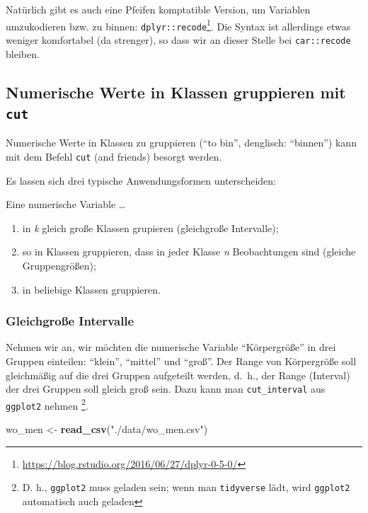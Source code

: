 \documentclass[12pt,ngerman,paper=a4,pagesize,DIV=13]{scrreprt}
\newenvironment{Shaded}{\begin{snugshade}}{\end{snugshade}}
\newcommand{\KeywordTok}[1]{\textcolor[rgb]{0.13,0.29,0.53}{\textbf{#1}}}
\newcommand{\NormalTok}[1]{#1}
\newcommand{\StringTok}[1]{\textcolor[rgb]{0.31,0.60,0.02}{#1}}
\providecommand{\tightlist}{%
  \setlength{\itemsep}{0pt}\setlength{\parskip}{0pt}}
\begin{document}
Natürlich gibt es auch eine Pfeifen komptatible Version, um Variablen
umzukodieren bzw. zu binnen: \texttt{dplyr::recode}\footnote{\url{https://blog.rstudio.org/2016/06/27/dplyr-0-5-0/}}.
Die Syntax ist allerdings etwas weniger komfortabel (da strenger), so
dass wir an dieser Stelle bei \texttt{car::recode} bleiben.

\hypertarget{numerische-werte-in-klassen-gruppieren-mit-cut}{%
\subsection{\texorpdfstring{Numerische Werte in Klassen gruppieren mit
\texttt{cut}}{Numerische Werte in Klassen gruppieren mit cut}}\label{numerische-werte-in-klassen-gruppieren-mit-cut}}

Numerische Werte in Klassen zu gruppieren (\enquote{to bin}, denglisch:
\enquote{binnen}) kann mit dem Befehl \texttt{cut} (and friends) besorgt
werden.

Es lassen sich drei typische Anwendungsformen unterscheiden:

Eine numerische Variable \dots

\begin{enumerate}
\def\labelenumi{\arabic{enumi}.}
\tightlist
\item
  in \emph{k} gleich große Klassen grupieren (gleichgroße Intervalle);
\item
  so in Klassen gruppieren, dass in jeder Klasse \emph{n} Beobachtungen
  sind (gleiche Gruppengrößen);
\item
  in beliebige Klassen gruppieren.
\end{enumerate}

\hypertarget{gleichgroe-intervalle}{%
\subsubsection{Gleichgroße Intervalle}\label{gleichgroe-intervalle}}

Nehmen wir an, wir möchten die numerische Variable \enquote{Körpergröße}
in drei Gruppen einteilen: \enquote{klein}, \enquote{mittel} und
\enquote{groß}. Der Range von Körpergröße soll gleichmäßig auf die drei
Gruppen aufgeteilt werden, d.~h., der Range (Interval) der drei Gruppen
soll gleich groß sein. Dazu kann man \texttt{cut\_interval} aus
\texttt{ggplot2} nehmen \footnote{D. h., \texttt{ggplot2} muss geladen
  sein; wenn man \texttt{tidyverse} lädt, wird \texttt{ggplot2}
  automatisch auch geladen}.

\begin{Shaded}
\begin{Highlighting}[]
\NormalTok{wo_men <-}\StringTok{ }\KeywordTok{read_csv}\NormalTok{(}\StringTok{"./data/wo_men.csv"}\NormalTok{)}
\end{Highlighting}
\end{Shaded}
\end{document}
